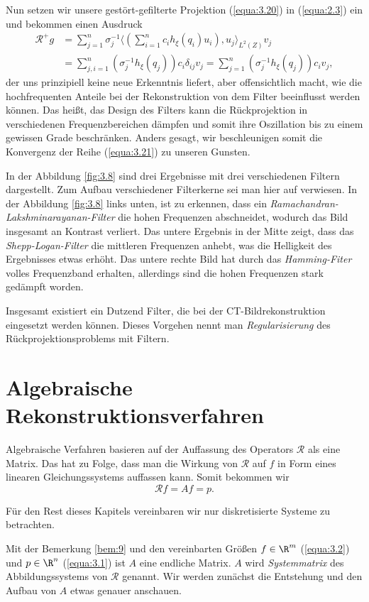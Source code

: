 Nun setzen wir unsere gestört-gefilterte Projektion (\ref{equa:3.20}) in (\ref{equa:2.3}) ein und bekommen einen Ausdruck
\begin{equation}
	\begin{split}
		\mathcal{R}^{+} g & = \sum\limits_{j = 1}^{n} \sigma_j^{-1} \langle \left( \sum \limits_{i = 1}^{n} c_i h_{\xi}(q_i) u_i \right), u_j \rangle_{L^2(Z)} v_j \\
		& = \sum\limits_{j,i = 1}^{n} ( \sigma_j^{-1} h_{\xi}(q_j) ) c_i \delta_{ij} v_j = \sum\limits_{j = 1}^{n} ( \sigma_j^{-1} h_{\xi}(q_j) ) c_i v_j,
	\end{split}
	\label{equa:3.21}
\end{equation}
der uns prinzipiell keine neue Erkenntnis liefert, aber offensichtlich macht, wie die hochfrequenten Anteile bei der Rekonstruktion von dem Filter beeinflusst werden können. Das heißt, das Design des Filters kann die Rückprojektion in verschiedenen Frequenzbereichen dämpfen und somit ihre Oszillation bis zu einem gewissen Grade beschränken. Anders gesagt, wir beschleunigen somit die Konvergenz der Reihe (\ref{equa:3.21}) zu unseren Gunsten. 

In der Abbildung \ref{fig:3.8} sind drei Ergebnisse mit drei verschiedenen Filtern dargestellt. Zum Aufbau verschiedener Filterkerne sei man hier auf \cite[S. 191]{Buzug04} verwiesen. In der Abbildung \ref{fig:3.8} links unten, ist zu erkennen, dass ein \textit{Ramachandran-Lakshminarayanan-Filter} die hohen Frequenzen abschneidet, wodurch das Bild insgesamt an Kontrast verliert. Das untere Ergebnis in der Mitte zeigt, dass das \textit{Shepp-Logan-Filter} die mittleren Frequenzen anhebt, was die Helligkeit des Ergebnisses etwas erhöht. Das untere rechte Bild hat durch das \textit{Hamming-Fiter} volles Frequenzband erhalten, allerdings sind die hohen Frequenzen stark gedämpft worden.

Insgesamt existiert ein Dutzend Filter, die bei der CT-Bildrekonstruktion eingesetzt werden können. Dieses Vorgehen nennt man \textit{Regularisierung} des Rückprojektionsproblems mit Filtern.  

\section{Algebraische Rekonstruktionsverfahren}
\label{cha:3.2}

Algebraische Verfahren basieren auf der Auffassung des Operators $\mathcal{R}$ als eine Matrix. Das hat zu Folge, dass man die Wirkung von $\mathcal{R}$ auf $f$ in Form eines linearen Gleichungssystems auffassen kann. Somit bekommen wir
\begin{equation}
	\mathcal{R}f = Af = p.
	\label{equa:3.22}
\end{equation}
\begin{Bemerkung}
	Für den Rest dieses Kapitels vereinbaren wir nur diskretisierte Systeme zu betrachten. 
	\label{bem:9}
\end{Bemerkung}
Mit der Bemerkung \ref{bem:9} und den vereinbarten Größen $f \in \R^m$ (\ref{equa:3.2}) und $p \in \R^n$ (\ref{equa:3.1}) ist $A$ eine endliche Matrix. $A$ wird \textit{Systemmatrix} des Abbildungssystems von $\mathcal{R}$ genannt. Wir werden zunächst die Entstehung und den Aufbau von $A$ etwas genauer anschauen. 


